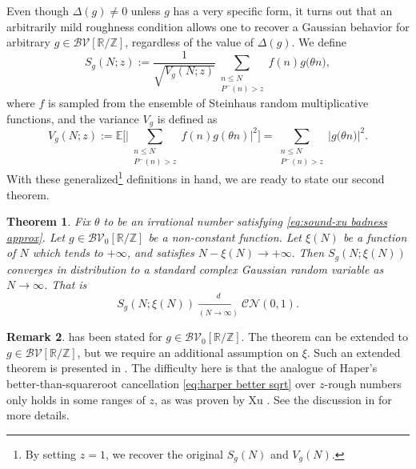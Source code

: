\documentclass[12pt]{amsart}
\renewcommand{\leq}{\leqslant}
\numberwithin{equation}{section}
\theoremstyle{plain}
\newtheorem{thm}{Theorem}[section]
\theoremstyle{definition}
\newtheorem{rem}[thm]{Remark}
\newcommand{\Z}{\mathbb{Z}}
\newcommand{\R}{\mathbb{R}}
\newcommand{\E}{\mathbb{E}}
\newcommand{\CB}{\mathcal{B}}
\newcommand{\CC}{\mathcal{C}}
\newcommand{\CN}{\mathcal{N}}
\newcommand{\CV}{\mathcal{V}}
\begin{document}
	Even though $\Delta(g) \ne 0$ unless $g$ has a very specific form, it turns out that an arbitrarily mild roughness condition allows one to recover a Gaussian behavior for arbitrary $g \in \CB\CV[\R/\Z]$, regardless of the value of $\Delta(g)$. We define
	\begin{equation}\label{eq:def S_N rough}
		S_{g}(N;z) := \frac{1}{\sqrt{V_{g}(N;z)}}\sum_{\substack{n \leq N \\ P^-(n) > z}} f(n) g\big(\theta n\big),
	\end{equation}
	where $f$ is sampled from the ensemble of Steinhaus random multiplicative functions, and the variance $V_{g}$ is defined as
	$$V_{g}(N;z) := \E\Big[\Big|\sum_{\substack{n \leq N \\ P^-(n) > z}}f(n)g(\theta n)\Big|^2\Big] = \sum_{\substack{n \leq N \\ P^-(n) > z}}\Big|g\big(\theta n\big)\Big|^2.$$
	With these generalized\footnote{
		By setting $z=1$, we recover the original $S_g(N)$ and $V_g(N)$.
	} definitions in hand, we are ready to state our second theorem. 
	\begin{thm}\label{thm:B}
		Fix $\theta$ to be an irrational number satisfying \eqref{eq:sound-xu badness approx}. Let $g \in \CB\CV_0[\R/\Z]$ be a non-constant function. Let $\xi(N)$ be a function of $N$ which tends to $+\infty$, and satisfies $N-\xi(N) \to +\infty.$ Then $S_{g}(N;\xi(N))$ converges in distribution to a standard complex Gaussian random variable as $N \to \infty$. That is
		$$S_{g}(N;\xi(N)) \xrightarrow[(N \to \infty)]{d} \CC\CN(0,1).$$
	\end{thm}
	\begin{rem}
		 has been stated for $g \in \CB\CV_0[\R/\Z]$. The theorem can be extended to $g \in \CB\CV[\R/\Z]$, but we require an additional assumption on $\xi$. Such an extended theorem is presented in . The difficulty here is that the analogue of Haper's better-than-squareroot cancellation \eqref{eq:harper better sqrt} over $z$-rough numbers only holds in some ranges of $z$, as was proven by Xu \cite{xu2024better}. See the discussion in  for more details.
	\end{rem}
	
\end{document}
